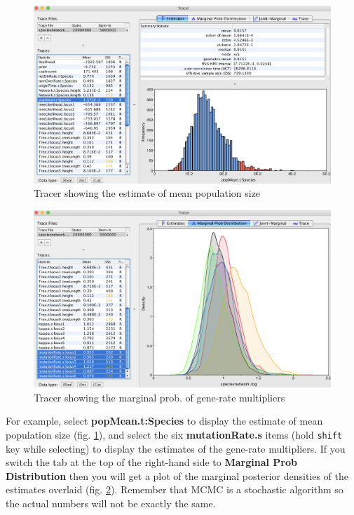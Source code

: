 \documentclass[11pt]{article}
\begin{document}
\begin{figure}[h]
\center
\includegraphics[width=1.0\textwidth]{figs/fig10_tracer1}
\caption{Tracer showing the estimate of mean population size}
\label{fig_tracer1}
\end{figure}

\begin{figure}[h]
\center
\includegraphics[width=1.0\textwidth]{figs/fig11_tracer2}
\caption{Tracer showing the marginal prob. of gene-rate multipliers}
\label{fig_tracer2}
\end{figure}

For example, select \textbf{popMean.t:Species} to display the estimate of mean population size (fig. \ref{fig_tracer1}), and select the six \textbf{mutationRate.s} items (hold \texttt{shift} key while selecting) to display the estimates of the gene-rate multipliers. If you switch the tab at the top of the right-hand side to {\bf Marginal Prob Distribution} then you will get a plot of the marginal posterior densities of the estimates overlaid (fig. \ref{fig_tracer2}).
Remember that MCMC is a stochastic algorithm so the actual numbers will not be exactly the same.
\end{document}
